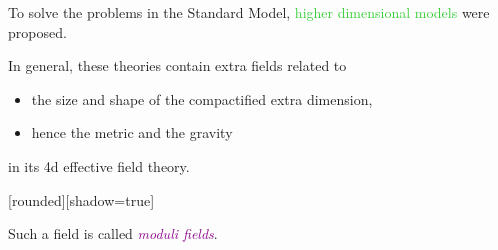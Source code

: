 \documentclass[
  unicode,a4paper,11pt,aspectratio=169,
  xcolor = {dvipsnames,svgnames},
  hyperref ={colorlinks=true,citecolor=Navy,linkcolor=NavyBlue,urlcolor=purple},
  ja=standard,lualatex
]{beamer}
\renewcommand{\theequation}{\thesection.\arabic{equation}}
\renewcommand{\thefigure}{\thesection.\arabic{figure}}
\renewcommand{\thetable}{\thesection.\arabic{table}}
\begin{document}
\begin{frame}

  To solve the problems in the Standard Model, \textcolor{LimeGreen}{higher dimensional models} were proposed.

  \vspace{10pt}

  \pause

  In general, these theories contain extra fields related to
  \begin{itemize}
    \item
          the size and shape of the compactified extra dimension,
    \item
          hence the metric and the gravity
  \end{itemize}
  in its 4d effective field theory.

  \vspace{10pt}

  \pause

  [rounded][shadow=true]

  \begin{block}{}
    \centering
    \large
    Such a field is called \textcolor{DarkMagenta}{\textit{moduli fields}}.
  \end{block}

\end{frame}


\begin{frame}

  




\end{frame}





\end{document}
